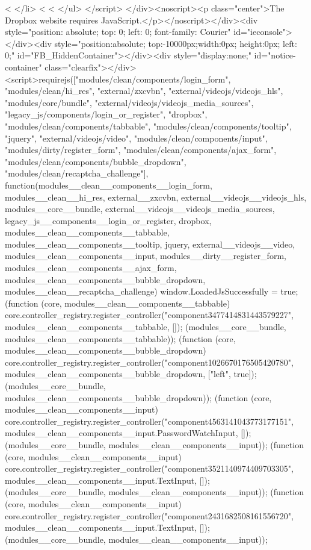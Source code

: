 {          <%
        </li>
      <%
  <%
    </ul>
</script>
</div><noscript><p class="center">The Dropbox website requires JavaScript.</p></noscript></div><div style="position: absolute; top: 0; left: 0; font-family: Courier" id="ieconsole"></div><div style="position:absolute; top:-10000px;width:0px; height:0px; left: 0;" id="FB_HiddenContainer"></div><div style="display:none;" id="notice-container" class="clearfix"></div><script>requirejs(["modules/clean/components/login_form", "modules/clean/hi_res", "external/zxcvbn", "external/videojs/videojs_hls", "modules/core/bundle", "external/videojs/videojs_media_sources", "legacy_js/components/login_or_register", "dropbox", "modules/clean/components/tabbable", "modules/clean/components/tooltip", "jquery", "external/videojs/video", "modules/clean/components/input", "modules/dirty/register_form", "modules/clean/components/ajax_form", "modules/clean/components/bubble_dropdown", "modules/clean/recaptcha_challenge"], function(modules__clean__components__login_form, modules__clean__hi_res, external__zxcvbn, external__videojs__videojs_hls, modules__core__bundle, external__videojs__videojs_media_sources, legacy_js__components__login_or_register, dropbox, modules__clean__components__tabbable, modules__clean__components__tooltip, jquery, external__videojs__video, modules__clean__components__input, modules__dirty__register_form, modules__clean__components__ajax_form, modules__clean__components__bubble_dropdown, modules__clean__recaptcha_challenge) { window.LoadedJsSuccessfully = true;
(function (core, modules__clean__components__tabbable) { core.controller_registry.register_controller("component3477414831443579227", modules__clean__components__tabbable, []); }(modules__core__bundle, modules__clean__components__tabbable));
(function (core, modules__clean__components__bubble_dropdown) { core.controller_registry.register_controller("component1026670176505420780", modules__clean__components__bubble_dropdown, ["left", true]); }(modules__core__bundle, modules__clean__components__bubble_dropdown));
(function (core, modules__clean__components__input) { core.controller_registry.register_controller("component4563141043773177151", modules__clean__components__input.PasswordWatchInput, []); }(modules__core__bundle, modules__clean__components__input));
(function (core, modules__clean__components__input) { core.controller_registry.register_controller("component3521140974409703305", modules__clean__components__input.TextInput, []); }(modules__core__bundle, modules__clean__components__input));
(function (core, modules__clean__components__input) { core.controller_registry.register_controller("component2431682508161556720", modules__clean__components__input.TextInput, []); }(modules__core__bundle, modules__clean__components__input));
}}
